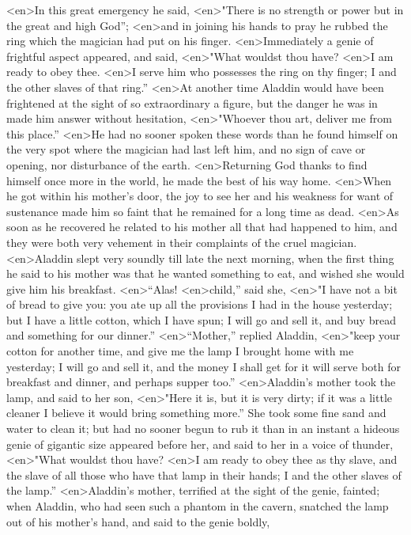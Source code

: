 <en>In this great emergency he said,
<en>"There is no strength or power but in the great and high God”;
<en>and in joining his hands to pray he rubbed the ring which the magician had put on his finger.
<en>Immediately a genie of frightful aspect appeared, and said,
<en>"What wouldst thou have?
<en>I am ready to obey thee.
<en>I serve him who possesses the ring on thy finger; I and the other slaves of that ring.”
<en>At another time Aladdin would have been frightened at the sight of so extraordinary a figure, but the danger he was in made him answer without hesitation,
<en>"Whoever thou art, deliver me from this place.”
<en>He had no sooner spoken these words than he found himself on the very spot where the magician had last left him, and no sign of cave or opening, nor disturbance of the earth.
<en>Returning God thanks to find himself once more in the world, he made the best of his way home.
<en>When he got within his mother’s door, the joy to see her and his weakness for want of sustenance made him so faint that he remained for a long time as dead.
<en>As soon as he recovered he related to his mother all that had happened to him, and they were both very vehement in their complaints of the cruel magician.
<en>Aladdin slept very soundly till late the next morning, when the first thing he said to his mother was that he wanted something to eat, and wished she would give him his breakfast.
<en>“Alas!
<en>child,” said she,
<en>"I have not a bit of bread to give you: you ate up all the provisions I had in the house yesterday; but I have a little cotton, which I have spun; I will go and sell it, and buy bread and something for our dinner.”
<en>“Mother,” replied Aladdin,
<en>"keep your cotton for another time, and give me the lamp I brought home with me yesterday; I will go and sell it, and the money I shall get for it will serve both for breakfast and dinner, and perhaps supper too.”
<en>Aladdin’s mother took the lamp, and said to her son,
<en>"Here it is, but it is very dirty; if it was a little cleaner I believe it would bring something more.” She took some fine sand and water to clean it; but had no sooner begun to rub it than in an instant a hideous genie of gigantic size appeared before her, and said to her in a voice of thunder,
<en>"What wouldst thou have?
<en>I am ready to obey thee as thy slave, and the slave of all those who have that lamp in their hands; I and the other slaves of the lamp.”
<en>Aladdin’s mother, terrified at the sight of the genie, fainted; when Aladdin, who had seen such a phantom in the cavern, snatched the lamp out of his mother’s hand, and said to the genie boldly,
